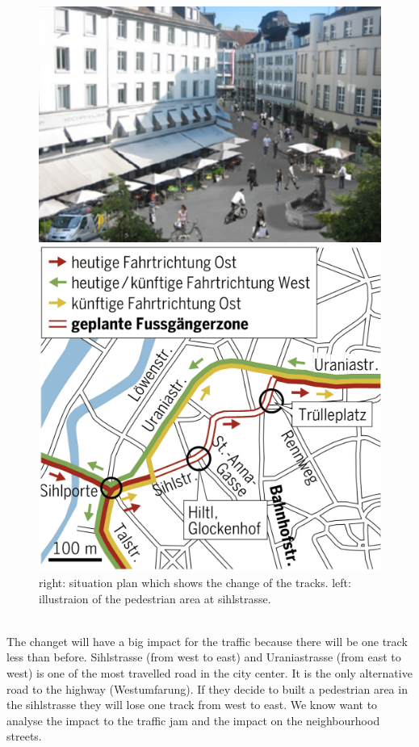 \documentclass[11pt]{article}
\begin{document}
\begin{figure}[h]
\begin{minipage}[t]{.45\textwidth}
	\centering
	\vspace{30pt}
\includegraphics[width=\textwidth]{pedestrianarea.png}
\end{minipage}\hfill
\begin{minipage}[t]{.45\textwidth}
	\centering
	\vspace{0pt}
\includegraphics[width=\textwidth]{Plan_Sihlstrasse.png}
\end{minipage}\hfill
\caption{right: situation plan which shows the change of the tracks. left: illustraion of the pedestrian area at sihlstrasse.}
\end{figure}
\\
The changet will have a big impact for the traffic because there will be one track less than before. Sihlstrasse (from west to east) and Uraniastrasse (from east to west) is one of the most travelled  road in the city center. It is the only alternative road to the highway (Westumfarung). If they decide to built a pedestrian area in the sihlstrasse they will lose one track from west to east.
We know want to analyse the impact to the traffic jam and the impact on the neighbourhood streets.
\end{document}

